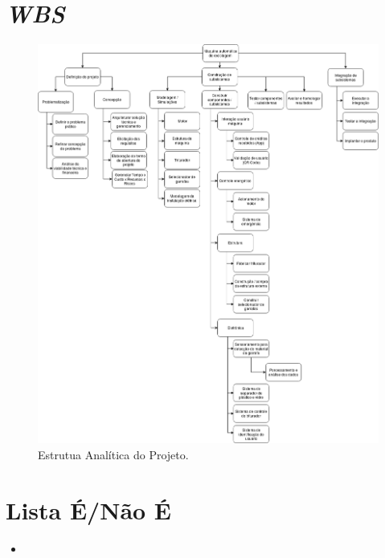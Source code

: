 \section{\textit{WBS}}

 \begin{figure}[!ht]
	\centering
		\includegraphics[scale=0.4]{figuras/eap}
	\caption{Estrutua Analítica do Projeto.}
\end{figure} 

\section{Lista É/Não É}

\begin{itemize}
\item 
\end{itemize}



